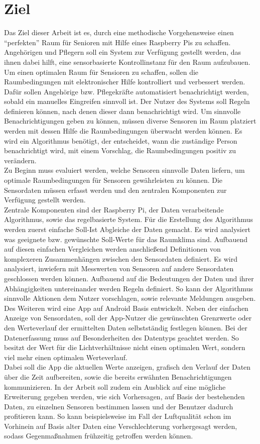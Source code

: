 \section{Ziel}
Das Ziel dieser Arbeit ist es, durch eine methodische Vorgehensweise einen ``perfekten'' Raum für Senioren mit Hilfe eines Raspberry Pis zu schaffen. Angehörigen und Pflegern soll ein System zur Verfügung gestellt werden, das ihnen dabei hilft, eine sensorbasierte Kontrollinstanz für den Raum aufzubauen.\\
Um einen optimalen Raum für Sensioren zu schaffen, sollen die Raumbedingungen mit elektronischer Hilfe kontrolliert und verbessert werden.
Dafür sollen Angehörige bzw. Pflegekräfte automatisiert benachrichtigt werden, sobald ein manuelles Eingreifen sinnvoll ist. Der Nutzer des Systems soll Regeln definieren können, nach denen dieser dann benachrichtigt wird.
Um sinnvolle Benachrichtigungen geben zu können, müssen diverse Sensoren im Raum platziert werden mit dessen Hilfe die Raumbedingungen überwacht werden können. Es wird ein Algorithmus benötigt, der entscheidet, wann die zuständige Person benachrichtigt wird, mit einem Vorschlag, die Raumbedingungen positiv zu verändern.\\
Zu Beginn muss evaluiert werden, welche Sensoren sinnvolle Daten liefern, um optimale Raumbedingungen für Sensoren gewährleisten zu können. Die Sensordaten müssen erfasst werden und den zentralen Komponenten zur Verfügung gestellt werden.\\
Zentrale Komponenten sind der Raspberry Pi, der Daten verarbeitende Algorithmus, sowie das regelbasierte System.
Für die Erstellung des Algorithmus werden zuerst einfache Soll-Ist Abgleiche der Daten gemacht. Es wird analysiert was geeignete bzw. gewünschte Soll-Werte für das Raumklima sind. Aufbauend auf diesen einfachen Vergleichen werden anschließend Definitionen von komplexeren Zusammenhängen zwischen den Sensordaten definiert. Es wird analysiert, inwiefern mit Messwerten von Sensoren auf andere Sensordaten geschlossen werden können. Aufbauend auf die Bedeutungen der Daten und ihrer Abhängigkeiten untereinander werden Regeln definiert. So kann der Algorithmus sinnvolle Aktionen dem Nutzer vorschlagen, sowie relevante Meldungen ausgeben.\\
Des Weiteren wird eine App auf Android Basis entwickelt. Neben der einfachen Anzeige von Sensordaten, soll der App-Nutzer die gewünschten Grenzwerte oder den Werteverlauf der ermittelten Daten selbstständig festlegen können. Bei der Datenerfassung muss auf Besonderheiten des Datentyps geachtet werden. So besitzt der Wert für die Lichtverhältnisse nicht einen optimalen Wert, sondern viel mehr einen optimalen Werteverlauf.\\
Dabei soll die App die aktuellen Werte anzeigen, grafisch den Verlauf der Daten über die Zeit aufbereiten, sowie die bereits erwähnten Benachrichtigungen kommunizieren.
In der Arbeit soll zudem ein Ausblick auf eine mögliche Erweiterung gegeben werden, wie sich Vorhersagen, auf Basis der bestehenden Daten, zu einzelnen Sensoren bestimmen lassen und der Benutzer dadurch profitieren kann. So kann beispielsweise im Fall der Luftqualität schon im Vorhinein auf Basis alter Daten eine Verschlechterung vorhergesagt werden, sodass Gegenmaßnahmen frühzeitig getroffen werden können.
